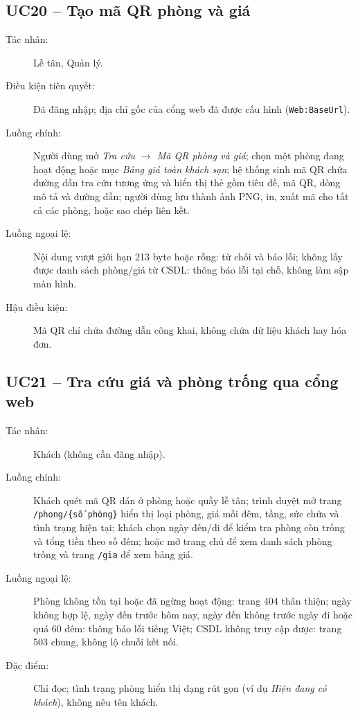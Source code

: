 \documentclass[14pt]{report}
\begin{document}
\subsection{UC20 -- Tạo mã QR phòng và giá}
\begin{description}
  \item[Tác nhân:] Lễ tân, Quản lý.
  \item[Điều kiện tiên quyết:] Đã đăng nhập; địa chỉ gốc của cổng web đã được cấu hình (\texttt{Web:BaseUrl}).
  \item[Luồng chính:] Người dùng mở \textit{Tra cứu $\rightarrow$ Mã QR phòng và giá}; chọn một phòng đang hoạt động hoặc mục \textit{Bảng giá toàn khách sạn}; hệ thống sinh mã QR chứa đường dẫn tra cứu tương ứng và hiển thị thẻ gồm tiêu đề, mã QR, dòng mô tả và đường dẫn; người dùng lưu thành ảnh PNG, in, xuất mã cho tất cả các phòng, hoặc sao chép liên kết.
  \item[Luồng ngoại lệ:] Nội dung vượt giới hạn 213 byte hoặc rỗng: từ chối và báo lỗi; không lấy được danh sách phòng/giá từ CSDL: thông báo lỗi tại chỗ, không làm sập màn hình.
  \item[Hậu điều kiện:] Mã QR chỉ chứa đường dẫn công khai, không chứa dữ liệu khách hay hóa đơn.
\end{description}

\subsection{UC21 -- Tra cứu giá và phòng trống qua cổng web}
\begin{description}
  \item[Tác nhân:] Khách (không cần đăng nhập).
  \item[Luồng chính:] Khách quét mã QR dán ở phòng hoặc quầy lễ tân; trình duyệt mở trang \texttt{/phong/\{số phòng\}} hiển thị loại phòng, giá mỗi đêm, tầng, sức chứa và tình trạng hiện tại; khách chọn ngày đến/đi để kiểm tra phòng còn trống và tổng tiền theo số đêm; hoặc mở trang chủ để xem danh sách phòng trống và trang \texttt{/gia} để xem bảng giá.
  \item[Luồng ngoại lệ:] Phòng không tồn tại hoặc đã ngừng hoạt động: trang 404 thân thiện; ngày không hợp lệ, ngày đến trước hôm nay, ngày đến không trước ngày đi hoặc quá 60 đêm: thông báo lỗi tiếng Việt; CSDL không truy cập được: trang 503 chung, không lộ chuỗi kết nối.
  \item[Đặc điểm:] Chỉ đọc; tình trạng phòng hiển thị dạng rút gọn (ví dụ \textit{Hiện đang có khách}), không nêu tên khách.
\end{description}
\end{document}
